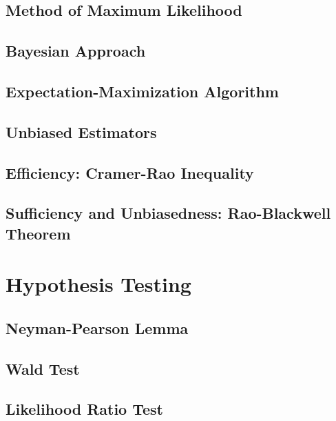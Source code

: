 \documentclass[
  openany]{book}
\theoremstyle{definition}
\theoremstyle{definition}
\theoremstyle{definition}
\theoremstyle{definition}
\theoremstyle{remark}
\begin{document}
\section{Method of Maximum Likelihood}\label{method-of-maximum-likelihood}

\section{Bayesian Approach}\label{bayesian-approach}

\section{Expectation-Maximization Algorithm}\label{expectation-maximization-algorithm}

\section{Unbiased Estimators}\label{unbiased-estimators}

\section{Efficiency: Cramer-Rao Inequality}\label{efficiency-cramer-rao-inequality}

\section{Sufficiency and Unbiasedness: Rao-Blackwell Theorem}\label{sufficiency-and-unbiasedness-rao-blackwell-theorem}

\chapter{Hypothesis Testing}\label{hypothesis-testing}

\section{Neyman-Pearson Lemma}\label{neyman-pearson-lemma}

\section{Wald Test}\label{wald-test}

\section{Likelihood Ratio Test}\label{likelihood-ratio-test}
\end{document}
